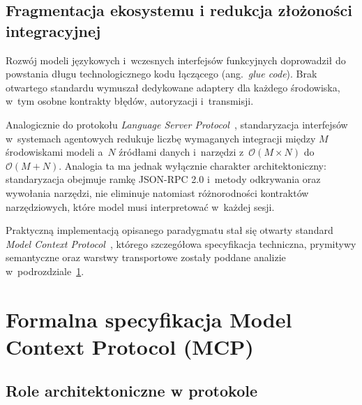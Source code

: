 \subsection{Fragmentacja ekosystemu i redukcja złożoności integracyjnej}
\label{subsec:teoria_fragmentacja}

Rozwój modeli językowych i~wczesnych interfejsów funkcyjnych doprowadził do powstania długu technologicznego kodu łączącego (ang.~\emph{glue code}). Brak otwartego standardu wymuszał dedykowane adaptery dla każdego środowiska, w~tym osobne kontrakty błędów, autoryzacji i~transmisji.

Analogicznie do protokołu \emph{Language Server Protocol}~\cite{lsp_spec}, standaryzacja interfejsów w~systemach agentowych redukuje liczbę wymaganych integracji między $M$ środowiskami modeli a~$N$ źródłami danych i~narzędzi z~$\mathcal{O}(M \times N)$ do $\mathcal{O}(M + N)$. Analogia ta ma jednak wyłącznie charakter architektoniczny: standaryzacja obejmuje ramkę JSON-RPC 2.0 i~metody odkrywania oraz wywołania narzędzi, nie eliminuje natomiast różnorodności kontraktów narzędziowych, które model musi interpretować w~każdej sesji.

Praktyczną implementacją opisanego paradygmatu stał się otwarty standard \emph{Model Context Protocol}~\cite{mcp_spec}, którego szczegółowa specyfikacja techniczna, prymitywy semantyczne oraz warstwy transportowe zostały poddane analizie w~podrozdziale~\ref{sec:teoria_specyfikacja_mcp}.

\section{Formalna specyfikacja Model Context Protocol (MCP)}
\label{sec:teoria_specyfikacja_mcp}

\subsection{Role architektoniczne w protokole}
\label{subsec:teoria_role_mcp}

